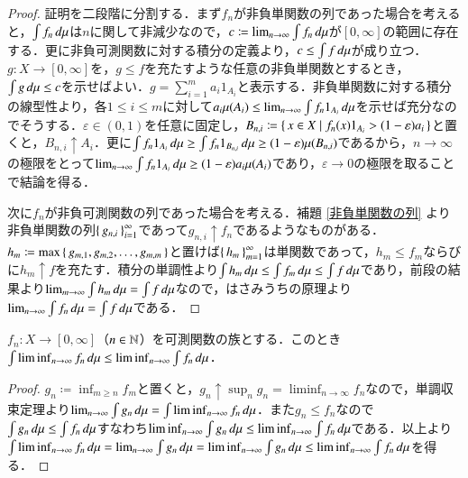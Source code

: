 \begin{proof}
証明を二段階に分割する．まず$f_n$が非負単関数の列であった場合を考えると，$\int f_n \mathop{}\!d \mu$は$n$に関して非減少なので，$c \coloneqq \lim_{n \to \infty}\int f_n \mathop{}\!d \mu$が$[0,\infty]$の範囲に存在する．更に非負可測関数に対する積分の定義より，$c \leq \int f \mathop{}\!d \mu$が成り立つ．$g \colon X \to [0,\infty]$を，$g \leq f$を充たすような任意の非負単関数とするとき，$\int g \mathop{}\!d \mu \leq c$を示せばよい．$g = \sum_{i=1}^m a_i 1_{A_i}$と表示する．非負単関数に対する積分の線型性より，各$1 \leq i \leq m$に対して$a_i \mu(A_i) \leq \lim_{n\to\infty} \int f_n1_{A_i} \mathop{}\!d \mu$を示せば充分なのでそうする．$\varepsilon \in (0,1)$を任意に固定し，$B_{n,i} \coloneqq \set{x \in X | f_n(x) 1_{A_i} > (1-\varepsilon) a_i }$と置くと，$B_{n,i} \uparrow A_i$．更に$\int f_n 1_{A_i} \mathop{}\!d \mu \geq \int f_n 1_{B_{n,i}} \mathop{}\!d \mu \geq (1-\varepsilon) \mu(B_{n,i})$であるから，$n \to \infty$の極限をとって$\lim_{n \to \infty} \int f_n 1_{A_i} \mathop{}\!d \mu \geq (1-\varepsilon) a_i \mu(A_i)$であり，$\varepsilon \to 0$の極限を取ることで結論を得る．

次に$f_n$が非負可測関数の列であった場合を考える．補題 \ref{非負単関数の列} より非負単関数の列$\set{g_{n,i}}_{i=1}^\infty$であって$g_{n,i} \uparrow f_n$であるようなものがある．$h_m \coloneqq \max\set{ g_{m,1}, g_{m,2},\dots, g_{m,m} }$と置けば$\set{h_m}_{m=1}^\infty$は単関数であって，$h_m \leq f_m$ならびに$h_m \uparrow f$を充たす．積分の単調性より$\int h_m \mathop{}\!d \mu \leq \int f_m \mathop{}\!d \mu \leq \int f \mathop{}\!d \mu$であり，前段の結果より$\lim_{m \to \infty} \int h_m \mathop{}\!d \mu = \int f \mathop{}\!d \mu$なので，はさみうちの原理より$\lim_{n \to \infty} \int f_n \mathop{}\!d \mu = \int f \mathop{}\!d \mu$である．
\end{proof}

\begin{thm}
$f_n \colon X \to [0,\infty]$（$n \in \mathbb{N}$）を可測関数の族とする．このとき$\int \liminf_{n \to \infty} f_n \mathop{}\!d \mu \leq \liminf_{n \to \infty} \int f_n \mathop{}\!d \mu $．
\end{thm}

\begin{proof}
$g_n \coloneqq \inf_{m \geq n} f_m$と置くと，$g_n \uparrow \sup_n g_n = \liminf_{n \to \infty} f_n$なので，単調収束定理より$\lim_{n \to \infty}\int g_n \mathop{}\!d \mu = \int \liminf_{n \to \infty} f_n \mathop{}\!d \mu$．また$g_n \leq f_n$なので$\int g_n \mathop{}\!d \mu \leq \int f_n \mathop{}\!d \mu$すなわち$\liminf_{n \to \infty}\int g_n \mathop{}\!d \mu \leq \liminf_{n\to\infty} \int f_n \mathop{}\!d \mu$である．以上より$\int \liminf_{n \to \infty} f_n \mathop{}\!d \mu = \lim_{n \to \infty}\int g_n \mathop{}\!d \mu = \liminf_{n \to \infty}\int g_n \mathop{}\!d \mu \leq \liminf_{n\to\infty} \int f_n \mathop{}\!d \mu$を得る．
\end{proof}

